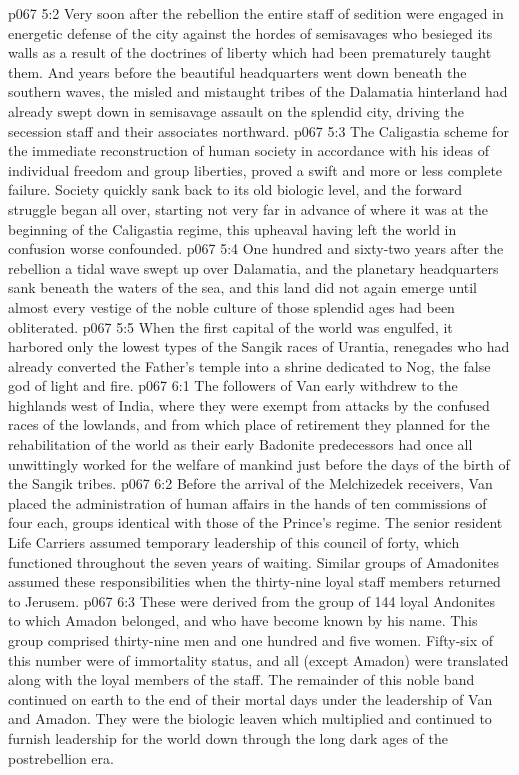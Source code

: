 \vs p067 5:2 Very soon after the rebellion the entire staff of sedition were engaged in energetic defense of the city against the hordes of semisavages who besieged its walls as a result of the doctrines of liberty which had been prematurely taught them. And years before the beautiful headquarters went down beneath the southern waves, the misled and mistaught tribes of the Dalamatia hinterland had already swept down in semisavage assault on the splendid city, driving the secession staff and their associates northward.
\vs p067 5:3 The Caligastia scheme for the immediate reconstruction of human society in accordance with his ideas of individual freedom and group liberties, proved a swift and more or less complete failure. Society quickly sank back to its old biologic level, and the forward struggle began all over, starting not very far in advance of where it was at the beginning of the Caligastia regime, this upheaval having left the world in confusion worse confounded.
\pc \vs p067 5:4 One hundred and sixty\hyp{}two years after the rebellion a tidal wave swept up over Dalamatia, and the planetary headquarters sank beneath the waters of the sea, and this land did not again emerge until almost every vestige of the noble culture of those splendid ages had been obliterated.
\vs p067 5:5 When the first capital of the world was engulfed, it harbored only the lowest types of the Sangik races of Urantia, renegades who had already converted the Father’s temple into a shrine dedicated to Nog, the false god of light and fire.
\vs p067 6:1 The followers of Van early withdrew to the highlands west of India, where they were exempt from attacks by the confused races of the lowlands, and from which place of retirement they planned for the rehabilitation of the world as their early Badonite predecessors had once all unwittingly worked for the welfare of mankind just before the days of the birth of the Sangik tribes.
\vs p067 6:2 Before the arrival of the Melchizedek receivers, Van placed the administration of human affairs in the hands of ten commissions of four each, groups identical with those of the Prince’s regime. The senior resident Life Carriers assumed temporary leadership of this council of forty, which functioned throughout the seven years of waiting. Similar groups of Amadonites assumed these responsibilities when the thirty\hyp{}nine loyal staff members returned to Jerusem.
\vs p067 6:3 These  were derived from the group of 144 loyal Andonites to which Amadon belonged, and who have become known by his name. This group comprised thirty\hyp{}nine men and one hundred and five women. Fifty\hyp{}six of this number were of immortality status, and all (except Amadon) were translated along with the loyal members of the staff. The remainder of this noble band continued on earth to the end of their mortal days under the leadership of Van and Amadon. They were the biologic leaven which multiplied and continued to furnish leadership for the world down through the long dark ages of the postrebellion era.
